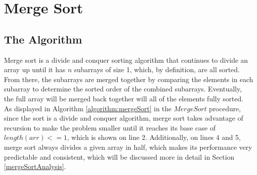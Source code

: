 \documentclass[letterpaper, 10pt,DIV=13]{scrartcl}
\numberwithin{equation}{section} %
\numberwithin{figure}{section} %
\numberwithin{table}{section} %
\begin{document}
\section{Merge Sort}
\subsection{The Algorithm}
Merge sort is a divide and conquer sorting algorithm that continues to divide an array up until it has $n$ subarrays of size 1, which, by definition, are all sorted. From there, the subarrays are merged together by comparing the elements in each subarray to determine the sorted order of the combined subarrays. Eventually, the full array will be merged back together will all of the elements fully sorted. As displayed in Algorithm \ref{algorithm:mergeSort} in the $MergeSort$ procedure, since the sort is a divide and conquer algorithm, merge sort takes advantage of recursion to make the problem smaller until it reaches its base case of $length(arr) <= 1$, which is shown on line 2. Additionally, on lines 4 and 5, merge sort always divides a given array in half, which makes its performance very predictable and consistent, which will be discussed more in detail in Section \ref{mergeSortAnalysis}.
\end{document}
